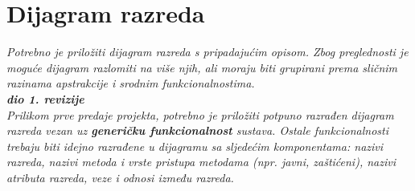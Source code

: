 {			\eject
			
			
		\section{Dijagram razreda}
		
			\textit{Potrebno je priložiti dijagram razreda s pripadajućim opisom. Zbog preglednosti je moguće dijagram razlomiti na više njih, ali moraju biti grupirani prema sličnim razinama apstrakcije i srodnim funkcionalnostima.}\\
			
			\textbf{\textit{dio 1. revizije}}\\
			
			\textit{Prilikom prve predaje projekta, potrebno je priložiti potpuno razrađen dijagram razreda vezan uz \textbf{generičku funkcionalnost} sustava. Ostale funkcionalnosti trebaju biti idejno razrađene u dijagramu sa sljedećim komponentama: nazivi razreda, nazivi metoda i vrste pristupa metodama (npr. javni, zaštićeni), nazivi atributa razreda, veze i odnosi između razreda.}\\
			
			

			
			
			\eject
}
